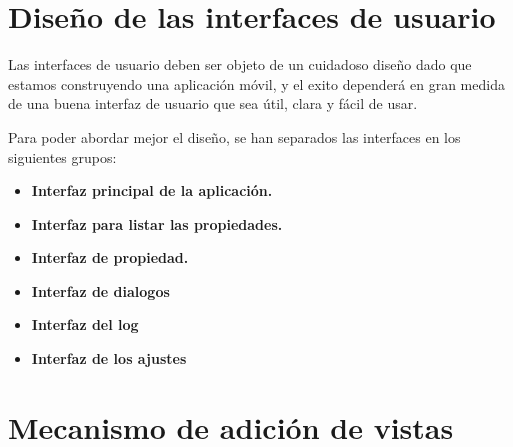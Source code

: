 \bigskip
\section{Diseño de las interfaces de usuario}

Las interfaces de usuario deben ser objeto de un cuidadoso diseño dado que estamos construyendo una aplicación móvil, y el exito dependerá en gran medida de una buena interfaz de usuario que sea útil, clara y fácil de usar.

\bigskip
Para poder abordar mejor el diseño, se han separados las interfaces en los siguientes grupos:

\begin{itemize}
  \item \textbf{Interfaz principal de la aplicación.}
  \item \textbf{Interfaz para listar las propiedades.}
  \item \textbf{Interfaz de propiedad.}
  \item \textbf{Interfaz de dialogos}
  \item \textbf{Interfaz del log}
  \item \textbf{Interfaz de los ajustes}
\end{itemize}

\bigskip
\subsection{}


\bigskip
\section{Mecanismo de adición de vistas}